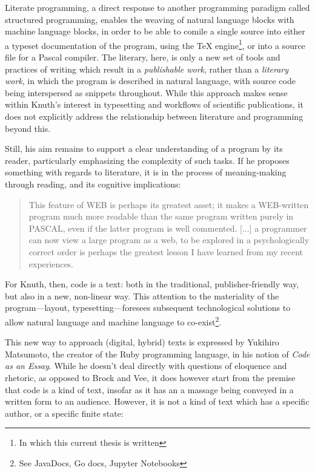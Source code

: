 Literate programming, a direct response to another programming paradigm called structured programming, enables the weaving of natural language blocks with machine language blocks, in order to be able to comile a single source into either a typeset documentation of the program, using the TeX engine\footnote{In which this current thesis is written}, or into a source file for a Pascal compiler. The literary, here, is only a new set of tools and practices of writing which result in a \emph{publishable work}, rather than a \emph{literary work}, in which the program is described in natural language, with source code being interspersed as snippets throughout. While this approach makes sense within Knuth's interest in typesetting and workflows of scientific publications, it does not explicitly address the relationship between literature and programming beyond this.

Still, his aim remains to support a clear understanding of a program by its reader, particularly emphasizing the complexity of such tasks. If he proposes something with regards to literature, it is in the process of meaning-making through reading, and its cognitive implications:

\begin{quote}
  This feature of WEB is perhaps its greatest asset; it makes a WEB-written program much more readable than the same program written purely in PASCAL, even if the latter program is well commented.  [...] a programmer can now view a large program as a web, to be explored in a psychologically correct order is perhaps the greatest lesson I have learned from my recent experiences.\cite{knuth_literate_1984}
\end{quote}

For Knuth, then, code is a text: both in the traditional, publisher-friendly way, but also in a new, non-linear way. This attention to the materiality of the program—layout, typesetting—foresees subsequent technological solutions to allow natural language and machine language to co-exist\footnote{See JavaDocs, Go docs, Jupyter Notebooks}.

This new way to approach (digital, hybrid) texts is expressed by Yukihiro Matsumoto, the creator of the Ruby programming language, in his notion of \emph{Code as an Essay}\cite{oram_beautiful_2007}. While he doesn't deal directly with questions of eloquence and rhetoric, as opposed to Brock and Vee, it does however start from the premise that code is a kind of text, insofar as it has an a massage being conveyed in a written form to an audience. However, it is not a kind of text which has a specific author, or a specific finite state:

